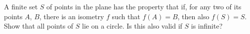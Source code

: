 A finite set $S$ of points in the plane has the property that if, for any two of its points $A$, $B$, there is an isometry $f$ such that $f(A) = B$, then also $f(S) = S$. Show that all points of $S$ lie on a circle. Is this also valid if $S$ is infinite?
